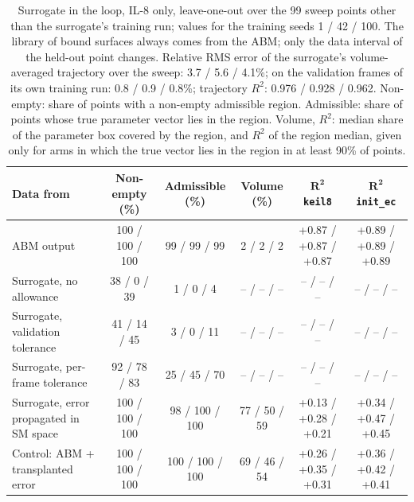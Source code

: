 \begin{table}[!htbp]
\caption{Surrogate in the loop, IL-8 only, leave-one-out over the 99 sweep points other than the surrogate's training run; values for the training seeds 1 / 42 / 100. The library of bound surfaces always comes from the ABM; only the data interval of the held-out point changes. Relative RMS error of the surrogate's volume-averaged trajectory over the sweep: 3.7 / 5.6 / 4.1\%; on the validation frames of its own training run: 0.8 / 0.9 / 0.8\%; trajectory $R^2$: 0.976 / 0.928 / 0.962. Non-empty: share of points with a non-empty admissible region. Admissible: share of points whose true parameter vector lies in the region. Volume, $R^2$: median share of the parameter box covered by the region, and $R^2$ of the region median, given only for arms in which the true vector lies in the region in at least 90\% of points.}
\label{tab:loop}
\centering\footnotesize
\setlength{\tabcolsep}{4pt}
\begin{tabular}{lccccc}
\toprule
\textbf{Data from} & \textbf{Non-empty (\%)} & \textbf{Admissible (\%)} & \textbf{Volume (\%)} & $\mathbf{R^2}$ \texttt{keil8} & $\mathbf{R^2}$ \texttt{init\_ec} \\
\midrule
ABM output & 100 / 100 / 100 & 99 / 99 / 99 & 2 / 2 / 2 & +0.87 / +0.87 / +0.87 & +0.89 / +0.89 / +0.89 \\
Surrogate, no allowance & 38 / 0 / 39 & 1 / 0 / 4 & -- / -- / -- & -- / -- / -- & -- / -- / -- \\
Surrogate, validation tolerance & 41 / 14 / 45 & 3 / 0 / 11 & -- / -- / -- & -- / -- / -- & -- / -- / -- \\
Surrogate, per-frame tolerance & 92 / 78 / 83 & 25 / 45 / 70 & -- / -- / -- & -- / -- / -- & -- / -- / -- \\
Surrogate, error propagated in SM space & 100 / 100 / 100 & 98 / 100 / 100 & 77 / 50 / 59 & +0.13 / +0.28 / +0.21 & +0.34 / +0.47 / +0.45 \\
Control: ABM + transplanted error & 100 / 100 / 100 & 100 / 100 / 100 & 69 / 46 / 54 & +0.26 / +0.35 / +0.31 & +0.36 / +0.42 / +0.41 \\
\bottomrule
\end{tabular}
\end{table}
